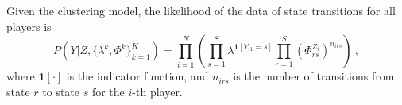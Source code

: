  

Given the clustering model, the likelihood of the data of state transitions for all players is
\begin{equation}
\label{eq:likeli}
  P(Y| Z, \{\lambda^k, \Phi^k \}_{k=1}^K) 
= \prod_{i=1}^N \left( \prod_{s=1}^S \lambda^{\mathbf{1}[Y_{i1} = s]} \prod_{r=1}^S \left(\Phi_{rs}^{Z_i}\right)^{n_{irs}} \right)~,
\end{equation}
where $\mathbf{1} [\cdot]$ is the indicator function, and $n_{irs}$ is the number of transitions from state $r$ to state $s$ for the $i$-th player.

